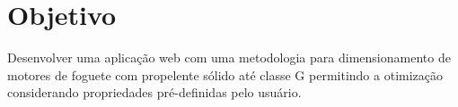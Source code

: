 \section{Objetivo}
\justifying
Desenvolver uma aplicação web com uma metodologia para dimensionamento de motores de foguete com propelente sólido até classe G permitindo a otimização considerando propriedades pré-definidas pelo usuário.